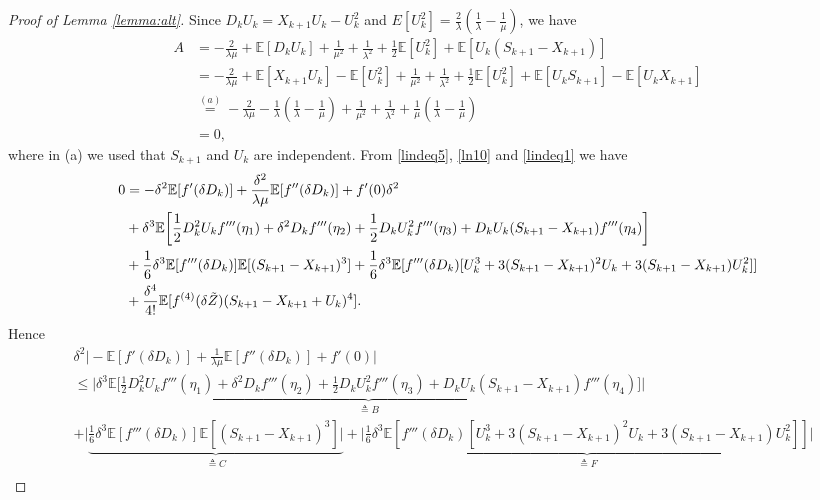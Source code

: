 \documentclass[11pt,letterpaper,reqno]{article}
\theoremstyle{thmstyleone}%
\theoremstyle{thmstyletwo}%
\theoremstyle{thmstylethree}%
\numberwithin{equation}{section}
\begin{document}
\begin{proof}[Proof of Lemma \ref{lemma:alt}]
Since $D_kU_k=X_{k+1}U_k-U_k^2$ and $E[U_k^2]=\frac{2}{\lambda}\left(\frac{1}{\lambda}-\frac{1}{\mu}\right)$, we have
\begin{align}\label{lindeq1}
A&=-\frac{2}{\lambda \mu}+\mathbb E[D_kU_k]+\frac{1}{\mu^2}+\frac{1}{\lambda^2}+\frac{1}{2}\mathbb E[U_k^2]+\mathbb E[U_k(S_{k+1}-X_{k+1})]  \nonumber \\
&=-\frac{2}{\lambda \mu}+\mathbb E[X_{k+1}U_k]-\mathbb E[U_k^2]+\frac{1}{\mu^2}+\frac{1}{\lambda^2}+\frac{1}{2}\mathbb E[U_k^2]+\mathbb E[U_kS_{k+1}]-\mathbb E[U_kX_{k+1}] \nonumber \\
&\stackrel{(a)}{=}-\frac{2}{\lambda \mu}-\frac{1}{\lambda}\left(\frac{1}{\lambda}-\frac{1}{\mu}\right) +\frac{1}{\mu^2}+\frac{1}{\lambda^2}+\frac{1}{\mu}\left( \frac{1}{\lambda}-\frac{1}{\mu}\right) \nonumber \\
&=0,
\end{align}
where in (a) we used that $S_{k+1}$ and $U_k$ are independent. From \eqref{lindeq5}, \eqref{ln10} and \eqref{lindeq1} we have
\begin{align*}
     0&=-\delta^2 \mathbb E[f'(\delta D_k)]+\frac{\delta^2}{\lambda \mu} \mathbb E[f''(\delta D_k)]+f'(0) \delta^2
      \\
      &+\delta^3 \mathbb E \bigg[\frac{1}{2}D_k^2U_kf'''(\eta_1)+\delta^2 D_k f'''(\eta_2) +\frac{1}{2}D_kU_k^2f'''(\eta_3)+D_kU_k(S_{k+1}-X_{k+1})f'''(\eta_4)\bigg]\\
      &+\frac{1}{6}\delta^3\mathbb E[f'''(\delta D_k)]\mathbb E[(S_{k+1}-X_{k+1})^3]+\frac{1}{6}\delta^3 \mathbb E[f'''(\delta D_k) [U_k^3+3(S_{k+1}-X_{k+1})^2U_k+3(S_{k+1}-X_{k+1})U_k^2]] \\
      &+\frac{\delta^4}{4!}\mathbb E[f^{(4)}(\delta \Tilde{Z})(S_{k+1}-X_{k+1}+U_k)^4].
\end{align*}
Hence
\begin{align}\label{ln12}
    &\delta^2\bigg|- \mathbb E[f'(\delta D_k)]+\frac{1}{\lambda \mu} \mathbb E[f''(\delta D_k)]+f'(0)\bigg| \nonumber\\
    &\leq \underbrace{\bigg|\delta^3 \mathbb E \bigg[\frac{1}{2}D_k^2U_kf'''(\eta_1)+\delta^2 D_k f'''(\eta_2) +\frac{1}{2}D_kU_k^2f'''(\eta_3)+D_kU_k(S_{k+1}-X_{k+1})f'''(\eta_4)\bigg]\bigg|}_{\triangleq B} \nonumber\\
      &+\bigg|\underbrace{\frac{1}{6}\delta^3\mathbb E[f'''(\delta D_k)]\mathbb E[(S_{k+1}-X_{k+1})^3]\bigg|}_{\triangleq C}+\underbrace{\bigg|\frac{1}{6}\delta^3 \mathbb E[f'''(\delta D_k) [U_k^3+3(S_{k+1}-X_{k+1})^2U_k+3(S_{k+1}-X_{k+1})U_k^2]] \bigg|}_{\triangleq F} \nonumber\\

\end{align}
\end{proof}
\end{document}
